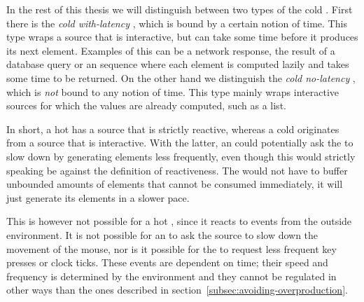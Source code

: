 In the rest of this thesis we will distinguish between two types of the cold \obs. First there is the \textit{cold with-latency \obs}, which is bound by a certain notion of time. This type wraps a source that is interactive, but can take some time before it produces its next element. Examples of this can be a network response, the result of a database query or an \ieb sequence where each element is computed lazily and takes some time to be returned. On the other hand we distinguish the \textit{cold no-latency \obs}, which is \emph{not} bound to any notion of time. This type mainly wraps interactive sources for which the values are already computed, such as a list.

In short, a hot \obs has a source that is strictly reactive, whereas a cold \obs originates from a source that is interactive. With the latter, an \obv could potentially ask the \obs to slow down by generating elements less frequently, even though this would strictly speaking be against the definition of reactiveness. The \obs would not have to buffer unbounded amounts of elements that cannot be consumed immediately, it will just generate its elements in a slower pace.

This is however not possible for a hot \obs, since it reacts to events from the outside environment. It is not possible for an \obv to ask the source to slow down the movement of the mouse, nor is it possible for the \obv to request less frequent key presses or clock ticks. These events are dependent on time; their speed and frequency is determined by the environment \cite{berry1991-Reactive} and they cannot be regulated in other ways than the ones described in section~\ref{subsec:avoiding-overproduction}.